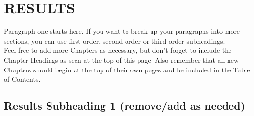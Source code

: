 %
%
%


\chapter{RESULTS}




\indent \indent Paragraph one starts here. If you want to break up your paragraphs into more sections, you can use first order, second order or third order subheadings. 
\\
\indent \indent Feel free to add more Chapters as necessary, but don’t forget to include the Chapter Headings as seen at the top of this page. Also remember that all new Chapters should begin at the top of their own pages and be included in the Table of Contents.
%
\vspace{-0.4em} %
\section{Results Subheading 1 (remove/add as needed)}
\vspace{-0.4em} %

